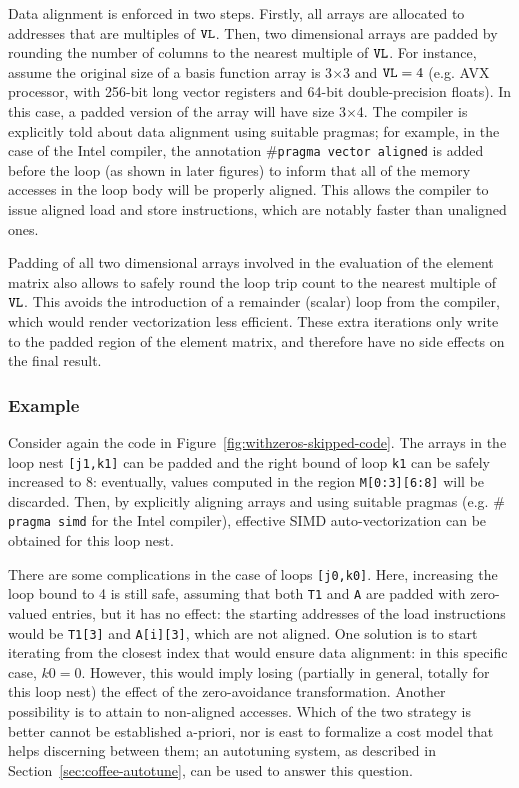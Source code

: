 Data alignment is enforced in two steps. Firstly, all arrays are allocated to addresses that are multiples of $\mbox{\texttt{VL}}$. Then, two dimensional arrays are padded by rounding the number of columns to the nearest multiple of $\mbox{\texttt{VL}}$. For instance, assume the original size of a basis function array is 3$\times$3 and $\mbox{\texttt{VL}}=4$ (e.g. AVX processor, with 256-bit long vector registers and 64-bit double-precision floats). In this case, a padded version of the array will have size 3$\times$4. The compiler is explicitly told about data alignment using suitable pragmas; for example, in the case of the Intel compiler, the annotation \texttt{$\#$pragma vector aligned} is added before the loop (as shown in later figures) to inform that all of the memory accesses in the loop body will be properly aligned. This allows the compiler to issue aligned load and store instructions, which are notably faster than unaligned ones.

Padding of all two dimensional arrays involved in the evaluation of the element matrix also allows to safely round the loop trip count to the nearest multiple of $\mbox{\texttt{VL}}$. This avoids the introduction of a remainder (scalar) loop from the compiler, which would render vectorization less efficient. These extra iterations only write to the padded region of the element matrix, and therefore have no side effects on the final result.

\subsubsection{Example}
Consider again the code in Figure~\ref{fig:withzeros-skipped-code}. The arrays in the loop nest \texttt{[j1,k1]} can be padded and the right bound of loop \texttt{k1} can be safely increased to 8: eventually, values computed in the region \texttt{M[0:3][6:8]} will be discarded. Then, by explicitly aligning arrays and using suitable pragmas (e.g. \texttt{$\#$pragma simd} for the Intel compiler), effective SIMD auto-vectorization can be obtained for this loop nest. 

There are some complications in the case of loops \texttt{[j0,k0]}. Here, increasing the loop bound to 4 is still safe, assuming that both \texttt{T1} and \texttt{A} are padded with zero-valued entries, but it has no effect: the starting addresses of the load instructions would be \texttt{T1[3]} and \texttt{A[i][3]}, which are not aligned. One solution is to start iterating from the closest index that would ensure data alignment: in this specific case, $k0=0$. However, this would imply losing (partially in general, totally for this loop nest) the effect of the zero-avoidance transformation. Another possibility is to attain to non-aligned accesses. Which of the two strategy is better cannot be established a-priori, nor is east to formalize a cost model that helps discerning between them; an autotuning system, as described in Section~\ref{sec:coffee-autotune}, can be used to answer this question.

